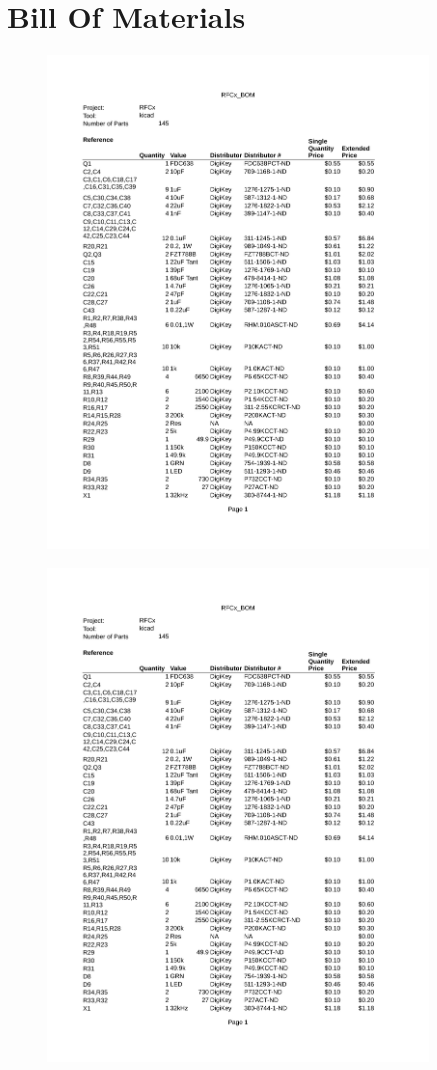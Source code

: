 \documentclass{article}
\numberwithin{figure}{section}
\numberwithin{equation}{section}
\begin{document}
{\section{Bill Of Materials} \label{sect:appendixB}
\begin{figure}[H]
	\centering
	\includegraphics[page=1,width=0.9\textwidth]{RFCx_BOM.pdf}
	\caption{}
	\label{fig:bom1}
\end{figure}
\begin{figure}[H]
	\centering
	\includegraphics[page=2,width=0.9\textwidth]{RFCx_BOM.pdf}

\end{figure}}
\end{document}
